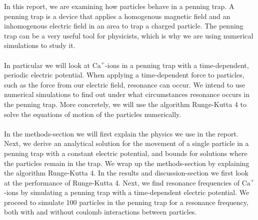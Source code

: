 In this report, we are examining how particles behave in a penning trap. A penning trap is a device that applies a homogenous magnetic field and an inhomogenous electric field in an area to trap a charged particle. The penning trap can be a very useful tool for physicists, which is why we are using numerical simulations to study it.
\\\\
In particular we will look at $\text{Ca}^+$-ions in a penning trap with a time-dependent, periodic electric potential. When applying a time-dependent force to particles, such as the force from our electric field, resonance can occur. We intend to use numerical simulations to find out under what circumstances resonance occurs in the penning trap. More concretely, we will use the algorithm Runge-Kutta 4 to solve the equations of motion of the particles numerically.
\\\\
In the methods-section we will first explain the physics we use in the report. Next, we derive an analytical solution for the movement of a single particle in a penning trap with a constant electric potential, and bounds for solutions where the particles remain in the trap. We wrap up the methods-section by explaining the algorithm Runge-Kutta 4. In the results and discussion-section we first look at the performance of Runge-Kutta 4. Next, we find resonance frequencies of $\text{Ca}^+$-ions by simulating a penning trap with a time-dependent electric potential. We proceed to simulate 100 particles in the penning trap for a resonance frequency, both with and without coulomb interactions between particles. 
